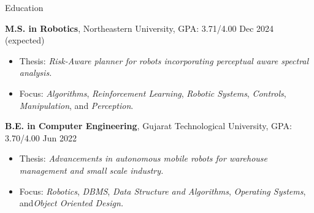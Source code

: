 \documentclass{resume}
\newcommand{\smallspace}{\hspace{0.2em}}
\begin{document}
\fancyheadoffset[RO]{5em}
\fancyfootoffset[RO]{0cm}
\thispagestyle{firstpage}
\vspace{-10pt}
\begin{rSection}{Education}


{\textbf {M.S. in Robotics}}, Northeastern University, GPA: 3.71/4.00 \hfill {Dec 2024 (expected)} 
 
\begin{itemize}
  \item[] \vspace{-0.5em} \hspace{-1.0em} Thesis: \emph{Risk-Aware planner for robots incorporating perceptual aware spectral analysis.}
  \item[] \vspace{-0.5em} \hspace{-1.0em} Focus: \emph{Algorithms}, \smallspace \emph{Reinforcement Learning}, \smallspace \emph{Robotic Systems}, \smallspace \emph{Controls}, \smallspace \emph{Manipulation}, \smallspace and \smallspace \emph{Perception}.
\end{itemize}


{\bf B.E. in Computer Engineering}, Gujarat Technological University, GPA: 3.70/4.00 \hfill {Jun 2022} 
\begin{itemize}
    \item[] \vspace{-0.5em} \hspace{-1.0em} Thesis: \emph{Advancements in autonomous mobile robots for warehouse management and small scale industry.}
    \item[] \vspace{-0.5em} \hspace{-1.0em} Focus: \emph{Robotics}, \smallspace \emph{DBMS}, \smallspace \emph{Data Structure and Algorithms}, \smallspace \emph{Operating Systems}, \smallspace and\smallspace \emph{Object Oriented Design.}
\end{itemize}
\end{rSection}
\vspace{-3mm}
\end{document}
